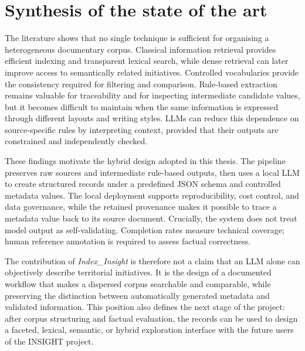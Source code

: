 \section{Synthesis of the state of the art}

The literature shows that no single technique is sufficient for organising a
heterogeneous documentary corpus. Classical information retrieval provides
efficient indexing and transparent lexical search, while dense retrieval can
later improve access to semantically related initiatives. Controlled
vocabularies provide the consistency required for filtering and comparison.
Rule-based extraction remains valuable for traceability and for inspecting
intermediate candidate values, but it becomes difficult to maintain when the
same information is expressed through different layouts and writing styles.
LLMs can reduce this dependence on source-specific rules by interpreting
context, provided that their outputs are constrained and independently checked.

These findings motivate the hybrid design adopted in this thesis. The pipeline
preserves raw sources and intermediate rule-based outputs, then uses a local
LLM to create structured records under a predefined JSON schema and controlled
metadata values. The local deployment supports reproducibility, cost control,
and data governance, while the retained provenance makes it possible to trace a
metadata value back to its source document. Crucially, the system does not treat
model output as self-validating. Completion rates measure technical coverage;
human reference annotation is required to assess factual correctness.

The contribution of \textit{Index\_Insight} is therefore not a claim that an
LLM alone can objectively describe territorial initiatives. It is the design of
a documented workflow that makes a dispersed corpus searchable and comparable,
while preserving the distinction between automatically generated metadata and
validated information. This position also defines the next stage of the
project: after corpus structuring and factual evaluation, the records can be
used to design a faceted, lexical, semantic, or hybrid exploration interface
with the future users of the INSIGHT project.
